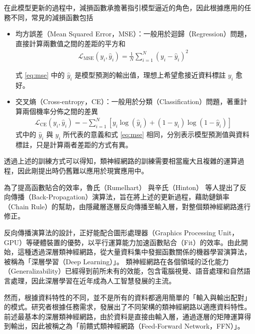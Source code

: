         在此模型更新的過程中，減損函數承擔著指引模型逼近的角色，因此根據應用的任務不同，常見的減損函數包括
\begin{itemize}
    \item 均方誤差（Mean Squared Error，MSE）：一般用於迴歸（Regression）問題，直接計算兩數值之間的差距的平方和
          \begin{align}
              \mathcal{L}_{\text{MSE}}(y_i, \hat{y}_i) = \frac{1}{N} \sum_{i=1}^{N} (y_i - \hat{y}_i)^2
              \label{eq:mse}
          \end{align}

          式 \eqref{eq:mse} 中的 \(\hat{y}_i\) 是模型預測的輸出值，理想上希望愈接近資料標註 \(y_i\) 愈好。
    \item 交叉熵（Cross-entropy，CE）：一般用於分類（Classification）問題，著重計算兩個機率分佈之間的差異
          \begin{align}
              \mathcal{L}_{\text{CE}}(y_i, \hat{y}_i) = - \sum_{i=1}^{N} \left[ y_i \log(\hat{y}_i) + (1 - y_i) \log(1 - \hat{y}_i) \right]
          \end{align}
          式中的 \(\hat{y}_i\) 與 \(y_i\) 所代表的意義和式 \eqref{eq:mse} 相同，分別表示模型預測值與資料標註，只是計算兩者差距的方式有異。
\end{itemize}

        透過上述的訓練方式可以得知，類神經網路的訓練需要相當龐大且複雜的運算過程，因此剛提出時仍舊難以應用於現實應用中。

        為了提高函數貼合的效率，魯氏（Rumelhart） \cite{rumelhart_learning_1986} 與辛氏（Hinton） \cite{rumelhart_learning_1987} 等人提出了反向傳播（Back-Propagation）演算法，旨在將上述的更新過程，藉助鏈鎖率（Chain Rule）的幫助，由隱藏層逐層反向傳播至輸入層，對整個類神經網路進行修正。

        反向傳播演算法的設計，正好能配合圖形處理器（Graphics Processing Unit，GPU）等硬體裝置的優勢，以平行運算能力加速函數貼合（Fit）的效率。由此開始，這種透過深層類神經網路，從大量資料集中發掘函數關係的機器學習演算法，被稱為「深層學習（Deep Learning）」。 類神經網路在各個領域的泛化能力（Generalizability）已經得到前所未有的效能，包含電腦視覺、語音處理和自然語言處理，因此深層學習在近年成為人工智慧發展的主流。

        然而，根據資料特性的不同，並不是所有的資料都適用簡單的「輸入與輸出配對」的模式。研究者根據任務需求，發展出了不同架構的類神經網路以適應資料特性。前述最基本的深層類神經網路，由於資料是直接由輸入層，通過逐層的矩陣運算得到輸出，因此被稱之為「前饋式類神經網路（Feed-Forward Network，FFN）」。


